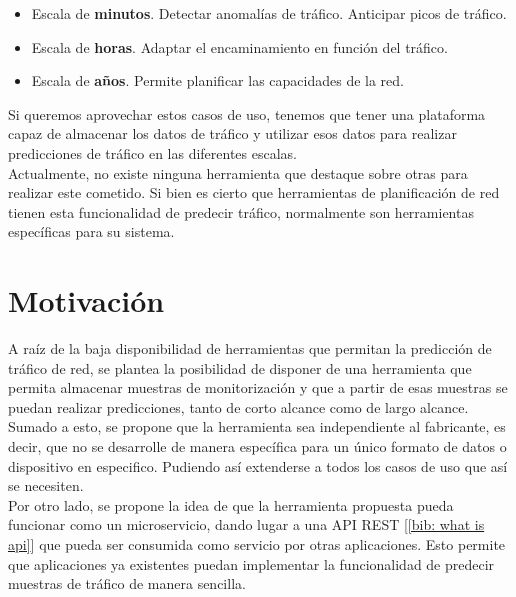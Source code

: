 \documentclass[a4paper, oneside, 12pt]{book}
\begin{document}
	\begin{itemize}
		\item Escala de \textbf{minutos}. Detectar anomalías de tráfico. Anticipar picos de tráfico.
		
		\item Escala de \textbf{horas}. Adaptar el encaminamiento en función del tráfico.
		
		\item Escala de \textbf{años}. Permite planificar las capacidades de la red.
	\end{itemize}
	
	\noindent Si queremos aprovechar estos casos de uso, tenemos que tener una plataforma capaz de almacenar los datos de tráfico y utilizar esos datos para realizar predicciones de tráfico en las diferentes escalas. \\
	
	\noindent Actualmente, no existe ninguna herramienta que destaque sobre otras para realizar este cometido. Si bien es cierto que herramientas de planificación de red tienen esta funcionalidad de predecir tráfico, normalmente son herramientas específicas para su sistema.
	
	
	\section{Motivación}
	
	\noindent A raíz de la baja disponibilidad de herramientas que permitan la predicción de tráfico de red, se plantea la posibilidad de disponer de una herramienta que permita almacenar muestras de monitorización y que a partir de esas muestras se puedan realizar predicciones, tanto de corto alcance como de largo alcance. Sumado a esto, se propone que la herramienta sea independiente al fabricante, es decir, que no se desarrolle de manera específica para un único formato de datos o dispositivo en especifico. Pudiendo así extenderse a todos los casos de uso que así se necesiten. \\
	
	\noindent Por otro lado, se propone la idea de que la herramienta propuesta pueda funcionar como un microservicio, dando lugar a una API REST [\ref{bib: what is api}] que pueda ser consumida como servicio por otras aplicaciones. Esto permite que aplicaciones ya existentes puedan implementar la funcionalidad de predecir muestras de tráfico de manera sencilla. \\
	
\end{document}
